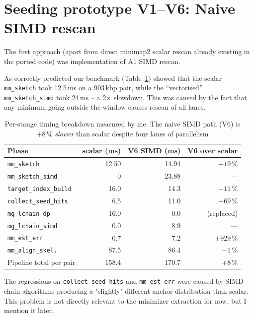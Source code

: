 \section{Seeding prototype V1--V6: Naive SIMD rescan}
\label{sec:v6-rescan}

The first approach (apart from direct minimap2 scalar rescan already existing in the ported code) was implementation of A1 SIMD rescan.

As correctly predicted our benchmark (Table~\ref{tab:v6-phase}) showed that the scalar
\texttt{mm\_sketch} took 12.5\,ms on a 903\,kbp pair, while the
``vectorised'' \texttt{mm\_sketch\_simd} took 24\,ms -- a 2$\times$
slowdown. This was caused by the fact that any minimum going outside the window causes rescan of all lanes.

\begin{table}[H]
  \centering
  \begin{tabular}{lrrr}
    \toprule
    Phase & scalar (ms) & V6 SIMD (ms) & V6 over scalar \\
    \midrule
    \texttt{mm\_sketch}      & 12.50 & 14.94 & $+19\,\%$ \\
    \texttt{mm\_sketch\_simd} & 0    & 23.88 & --- \\
    \texttt{target\_index\_build} & 16.0 & 14.3 & $-11\,\%$ \\
    \texttt{collect\_seed\_hits} & 6.5  & 11.0 & $+69\,\%$ \\
    \texttt{mg\_lchain\_dp}   & 16.0 & 0.0  & --- (replaced) \\
    \texttt{mg\_lchain\_simd} & 0.0  & 8.9  & --- \\
    \texttt{mm\_est\_err}     & 0.7  & 7.2  & $+929\,\%$ \\
    \texttt{mm\_align\_skel.}  & 87.5 & 86.4 & $-1\,\%$ \\
    \midrule
    Pipeline total per pair & 158.4 & 170.7 & $+8\,\%$ \\
    \bottomrule
  \end{tabular}
  \caption{Per-stange timing breakdown measured by me. The naive SIMD path (V6) is $+8\,\%$ \emph{slower} than
    scalar despite four lanes of parallelism}
  \label{tab:v6-phase}
\end{table}

The regressions on \texttt{collect\_seed\_hits} and
\texttt{mm\_est\_err} were caused by SIMD chain algorithms producing a "slightly"
different anchor distribution than scalar. This problem is not directly relevant to the minimizer extraction for now, but I mention it later.

